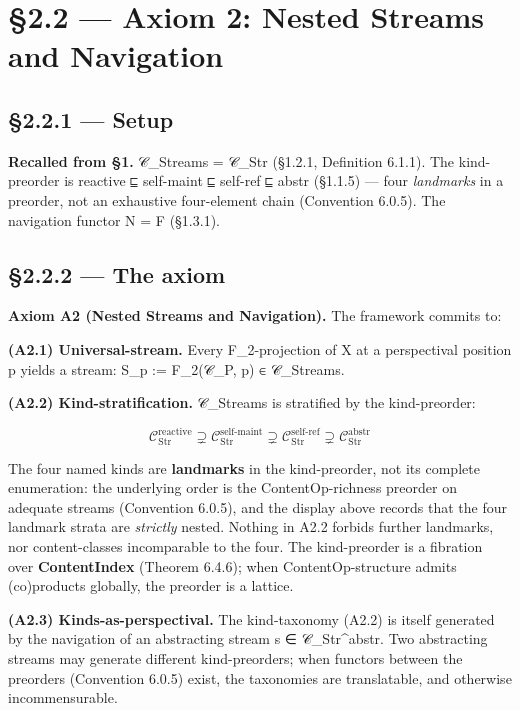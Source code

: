 \documentclass[11pt, openany]{book}
\newcommand{\sectionbreak}{\clearpage}
\begin{document}
\sectionbreak

\section{§2.2 --- Axiom 2: Nested Streams and Navigation}

\subsection{§2.2.1 --- Setup}

\textbf{Recalled from §1.} 𝒞\_\allowbreak{}Streams = 𝒞\_\allowbreak{}Str (§1.2.1, Definition 6.1.1). The kind-preorder is reactive ⊑ self-maint ⊑ self-ref ⊑ abstr (§1.1.5) --- four \textit{landmarks} in a preorder, not an exhaustive four-element chain (Convention 6.0.5). The navigation functor N = F (§1.3.1).

\subsection{§2.2.2 --- The axiom}

\textbf{Axiom A2 (Nested Streams and Navigation).} The framework commits to:

\textbf{(A2.1) Universal-stream.} Every F\_\allowbreak{}2-projection of X at a perspectival position p yields a stream: S\_\allowbreak{}p := F\_\allowbreak{}2(𝒞\_\allowbreak{}P, p) ∈ 𝒞\_\allowbreak{}Streams.

\textbf{(A2.2) Kind-stratification.} 𝒞\_\allowbreak{}Streams is stratified by the kind-preorder:

\[
\mathcal{C}_\mathrm{Str}^\mathrm{reactive} \supsetneq \mathcal{C}_\mathrm{Str}^\mathrm{self\text{-}maint} \supsetneq \mathcal{C}_\mathrm{Str}^\mathrm{self\text{-}ref} \supsetneq \mathcal{C}_\mathrm{Str}^\mathrm{abstr}
\]

The four named kinds are \textbf{landmarks} in the kind-preorder, not its complete enumeration: the underlying order is the ContentOp-richness preorder on adequate streams (Convention 6.0.5), and the display above records that the four landmark strata are \textit{strictly} nested. Nothing in A2.2 forbids further landmarks, nor content-classes incomparable to the four. The kind-preorder is a fibration over \textbf{ContentIndex} (Theorem 6.4.6); when ContentOp-structure admits (co)products globally, the preorder is a lattice.

\textbf{(A2.3) Kinds-as-perspectival.} The kind-taxonomy (A2.2) is itself generated by the navigation of an abstracting stream s ∈ 𝒞\_\allowbreak{}Str\textasciicircum{}abstr. Two abstracting streams may generate different kind-preorders; when functors between the preorders (Convention 6.0.5) exist, the taxonomies are translatable, and otherwise incommensurable.
\end{document}
